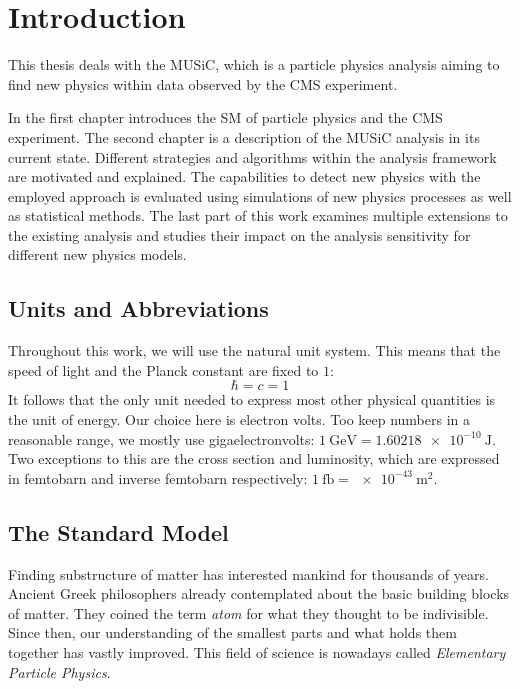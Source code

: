 
\chapter{Introduction}

This thesis deals with the \acf{MUSiC}, which is a particle physics analysis aiming to find new physics within data observed by the \acs{CMS} experiment.

In the first chapter introduces the \acl{SM} of particle physics and the \acs{CMS} experiment. 
The second chapter is a description of the \acs{MUSiC} analysis in its current state. Different strategies and algorithms within the analysis framework are motivated and explained. The capabilities to detect new physics with the employed approach is evaluated using simulations of new physics processes as well as statistical methods.
The last part of this work examines multiple extensions to the existing analysis and studies their impact on the analysis sensitivity for different new physics models.

\section{Units and Abbreviations}
Throughout this work, we will use the natural unit system. This means that the speed of light and the Planck constant are fixed to $1$:
\begin{equation*}
    \hbar = c = 1
\end{equation*}
It follows that the only unit needed to express most other physical quantities is the unit of energy. Our choice here is electron volts. Too keep numbers in a reasonable range, we mostly use gigaelectronvolts: $\SI{1}{\giga\eV} = \SI{1.60218e-10}{\joule}$.
Two exceptions to this are the cross section and luminosity, which are expressed in femtobarn and inverse femtobarn respectively: $\SI{1}{\femto\barn} = \SI{e-43}{\meter\squared}$.

\section{The Standard Model}
Finding substructure of matter has interested mankind for thousands of years. Ancient Greek philosophers already contemplated about the basic building blocks of matter\cite{Melsen:atomosatomhistory}. They coined the term \emph{atom} for what they thought to be indivisible. Since then, our understanding of the smallest parts and what holds them together has vastly improved. This field of science is nowadays called \emph{Elementary Particle Physics}. 

